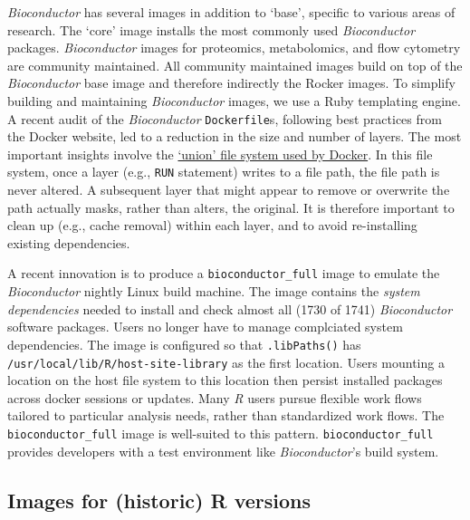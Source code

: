 \emph{Bioconductor} has several images in addition to `base', specific
to various areas of research. The `core' image installs the most
commonly used \emph{Bioconductor} packages. \emph{Bioconductor} images
for proteomics, metabolomics, and flow cytometry are community
maintained. All community maintained images build on top of the
\emph{Bioconductor} base image and therefore indirectly the Rocker
images. To simplify building and maintaining \emph{Bioconductor} images,
we use a Ruby templating engine. A recent audit of the
\emph{Bioconductor} \texttt{Dockerfile}s, following best practices from
the Docker website, led to a reduction in the size and number of layers.
The most important insights involve the
\href{https://docs.docker.com/storage/storagedriver/overlayfs-driver/\#how-container-reads-and-writes-work-with-overlay-or-overlay2}{`union'
file system used by Docker}. In this file system, once a layer (e.g.,
\texttt{RUN} statement) writes to a file path, the file path is never
altered. A subsequent layer that might appear to remove or overwrite the
path actually masks, rather than alters, the original. It is therefore
important to clean up (e.g., cache removal) within each layer, and to
avoid re-installing existing dependencies.

A recent innovation is to produce a \texttt{bioconductor\_full} image to
emulate the \emph{Bioconductor} nightly Linux build machine. The image
contains the \emph{system dependencies} needed to install and check
almost all (1730 of 1741) \emph{Bioconductor} software packages. Users
no longer have to manage complciated system dependencies. The image is
configured so that \texttt{.libPaths()} has
\texttt{/usr/local/lib/R/host-site-library} as the first location. Users
mounting a location on the host file system to this location then
persist installed packages across docker sessions or updates. Many
\emph{R} users pursue flexible work flows tailored to particular
analysis needs, rather than standardized work flows. The
\texttt{bioconductor\_full} image is well-suited to this pattern.
\texttt{bioconductor\_full} provides developers with a test environment
like \emph{Bioconductor}'s build system.

\hypertarget{images-for-historic-r-versions}{%
\subsection{Images for (historic) R
versions}\label{images-for-historic-r-versions}}

\label{versions}

